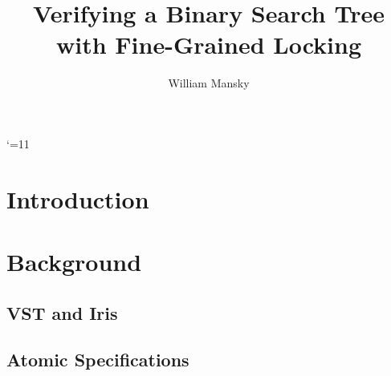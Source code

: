 \documentclass[acmsmall,screen]{acmart}\settopmatter{printfolios=true}
\title{Verifying a Binary Search Tree with Fine-Grained Locking }
\author{William Mansky}
\date{} %
\begin{document}
\maketitle

\catcode`\@=11
\section{Introduction}

\section{Background}
\subsection{VST and Iris}
\subsection{Atomic Specifications}
\end{document}
